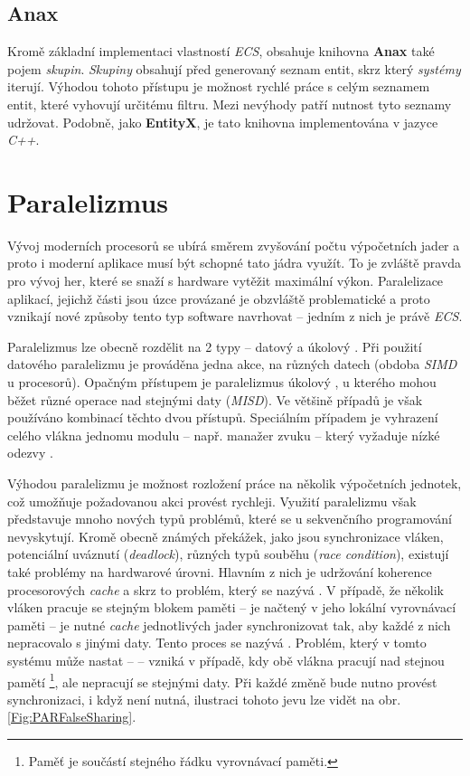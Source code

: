 \subsection{Anax}

Kromě základní implementaci vlastností \emph{ECS}, obsahuje knihovna \textbf{Anax} \cite{Anax} také pojem \emph{skupin}. \emph{Skupiny} obsahují před generovaný seznam entit, skrz který \emph{systémy} iterují. Výhodou tohoto přístupu je možnost rychlé práce s celým seznamem entit, které vyhovují určitému filtru. Mezi nevýhody patří nutnost tyto seznamy udržovat. Podobně, jako \textbf{EntityX}, je tato knihovna implementována v jazyce \emph{C++}. 

\section{Paralelizmus}
\label{Chap:Parallelism}

Vývoj moderních procesorů se ubírá směrem zvyšování počtu výpočetních jader \cite{CPUPerfHistory} a proto i moderní aplikace musí být schopné tato jádra využít. To je zvláště pravda pro vývoj her, které se snaží s hardware vytěžit maximální výkon. Paralelizace aplikací, jejichž části jsou úzce provázané je obzvláště problematické a proto vznikají nové způsoby tento typ software navrhovat -- jedním z nich je právě \emph{ECS}. 

Paralelizmus lze obecně rozdělit na 2 typy -- datový a úkolový \cite{KindsOfParallelism}. Při použití datového paralelizmu je prováděna jedna akce, na různých datech (obdoba \emph{SIMD} u procesorů). Opačným přístupem je paralelizmus úkolový \cite{TaskBasedParallelism}, u kterého mohou běžet různé operace nad stejnými daty (\emph{MISD}). Ve většině případů je však používáno kombinací těchto dvou přístupů. Speciálním případem je vyhrazení celého vlákna jednomu modulu -- např. manažer zvuku -- který vyžaduje nízké odezvy \cite{FrontierThreads}.

Výhodou paralelizmu je možnost rozložení práce na několik výpočetních jednotek, což umožňuje požadovanou akci provést rychleji. Využití paralelizmu však představuje mnoho nových typů problémů, které se u sekvenčního programování nevyskytují. Kromě obecně známých překážek, jako jsou synchronizace vláken, potenciální uváznutí (\emph{deadlock}), různých typů souběhu (\emph{race condition}), existují také problémy na hardwarové úrovni. Hlavním z nich je udržování koherence procesorových \emph{cache} \cite{CacheCoherence} a skrz to problém, který se nazývá  \cite{FalseSharing}. V případě, že několik vláken pracuje se stejným blokem paměti -- je načtený v jeho lokální vyrovnávací paměti -- je nutné \emph{cache} jednotlivých jader synchronizovat tak, aby každé z nich nepracovalo s jinými daty. Tento proces se nazývá . Problém, který v tomto systému může nastat --  -- vzniká v případě, kdy obě vlákna pracují nad stejnou pamětí \footnote{Paměť je součástí stejného řádku vyrovnávací paměti.}, ale nepracují se stejnými daty. Při každé změně bude nutno provést synchronizaci, i když není nutná, ilustraci tohoto jevu lze vidět na obr. \ref{Fig:PARFalseSharing}.

